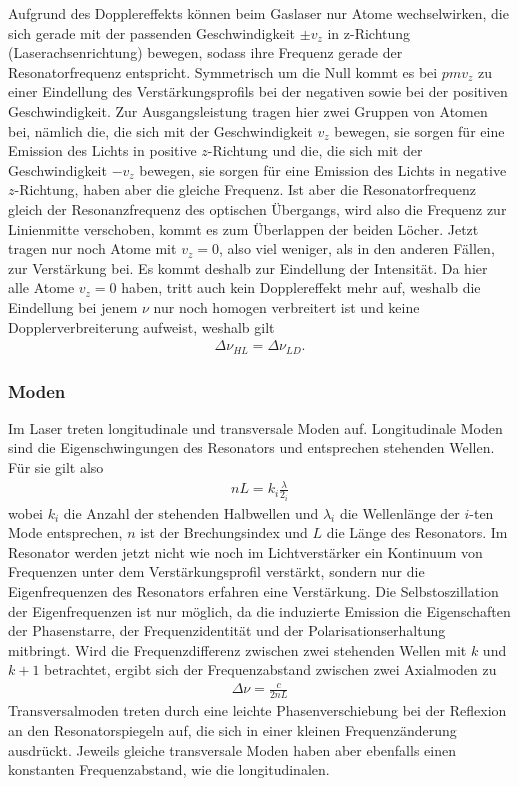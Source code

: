 \documentclass[a4paper,twoside,final]{article}
\begin{document}
Aufgrund des Dopplereffekts können beim Gaslaser nur Atome wechselwirken, die sich gerade mit der passenden Geschwindigkeit $\pm v_z$ in z-Richtung (Laserachsenrichtung) bewegen, sodass ihre Frequenz gerade der Resonatorfrequenz entspricht.  Symmetrisch um die Null kommt es bei $pm v_z$ zu einer Eindellung des Verstärkungsprofils bei der negativen sowie bei der positiven Geschwindigkeit. Zur Ausgangsleistung tragen hier zwei Gruppen von Atomen bei, nämlich die, die sich mit der Geschwindigkeit $v_z$ bewegen, sie sorgen für eine Emission des Lichts in positive $z$-Richtung und die, die sich mit der Geschwindigkeit $-v_z$ bewegen, sie sorgen für eine Emission des Lichts in negative $z$-Richtung, haben aber die gleiche Frequenz. Ist aber die Resonatorfrequenz gleich der Resonanzfrequenz des optischen Übergangs, wird also die Frequenz zur Linienmitte verschoben, kommt es zum Überlappen der beiden Löcher. Jetzt tragen nur noch Atome mit $v_z = 0$, also viel weniger, als in den anderen Fällen, zur Verstärkung bei. Es kommt deshalb zur Eindellung der Intensität. Da hier alle Atome $v_z = 0 $ haben, tritt auch kein Dopplereffekt mehr auf, weshalb die Eindellung bei jenem $\nu$ nur noch homogen verbreitert ist und keine Dopplerverbreiterung aufweist, weshalb gilt
\begin{align}
  \Delta \nu_{HL} = \Delta \nu_{LD}.
\end{align}


\subsubsection{Moden}
Im Laser treten longitudinale und transversale Moden  auf. Longitudinale Moden sind die Eigenschwingungen des Resonators und entsprechen stehenden Wellen. Für sie gilt also
\begin{align}
  n L = k_i \frac{\lambda}{2_i}
\end{align}
wobei $k_i$ die Anzahl der stehenden Halbwellen und $\lambda_i$ die Wellenlänge der $i$-ten Mode entsprechen, $n$ ist der Brechungsindex und $L$ die Länge des Resonators. Im Resonator werden jetzt nicht wie noch im Lichtverstärker ein Kontinuum von Frequenzen unter dem Verstärkungsprofil verstärkt, sondern nur die Eigenfrequenzen des Resonators erfahren eine Verstärkung. Die Selbstoszillation der Eigenfrequenzen ist nur möglich, da die induzierte Emission die Eigenschaften der Phasenstarre, der Frequenzidentität und der Polarisationserhaltung mitbringt. Wird die Frequenzdifferenz zwischen zwei stehenden Wellen mit $k$ und $k+1$ betrachtet, ergibt sich der Frequenzabstand zwischen zwei Axialmoden zu
\begin{align}
  \Delta \nu = \frac{c}{2nL}
\end{align}
Transversalmoden treten durch eine leichte Phasenverschiebung bei der Reflexion an den Resonatorspiegeln auf, die sich in einer kleinen Frequenzänderung ausdrückt. Jeweils gleiche transversale Moden haben aber ebenfalls einen konstanten Frequenzabstand, wie die longitudinalen.
\end{document}
